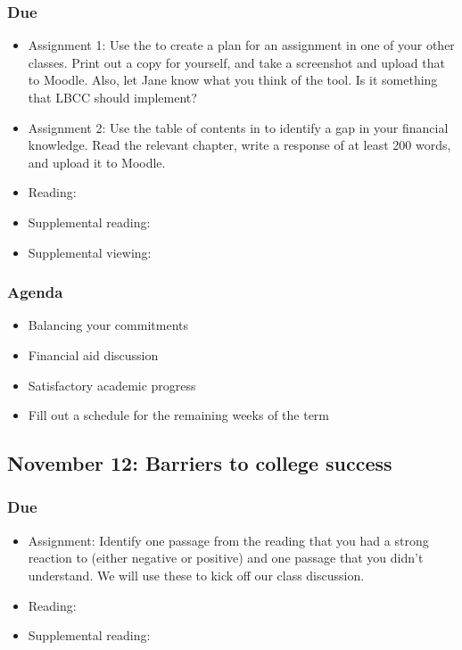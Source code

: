 \documentclass[12pt,article,oneside]{memoir}
\begin{document}
\subsubsection{Due}
\begin{itemize}
 \item Assignment 1: Use the  to create a plan for an assignment in one of your other classes.  Print out a copy for yourself, and take a screenshot and upload that to Moodle.  Also, let Jane know what you think of the tool. Is it something that LBCC should implement?
 \item Assignment 2: Use the table of contents in \cite{everyday} to identify a gap in your financial knowledge.  Read the relevant chapter, write a response of at least 200 words, and upload it to Moodle.
 \item Reading: \cite{finra}
 \item Supplemental reading: \cite{smart}
 \item Supplemental viewing: \cite{credits}
\end{itemize}

\subsubsection{Agenda}
\begin{itemize}
\item Balancing your commitments
\item Financial aid discussion
\item Satisfactory academic progress
\item Fill out a schedule for the remaining weeks of the term
\end{itemize}



\subsection{November 12: Barriers to college success}
\subsubsection{Due}
\begin{itemize}
 \item Assignment: Identify one passage from the reading that you had a strong reaction to (either negative or positive) and one passage that you didn't understand.  We will use these to kick off our class discussion.
 \item Reading: \cite{guillory2008s}
 \item Supplemental reading: \cite{rosenberg}
\end{itemize}
\end{document}
